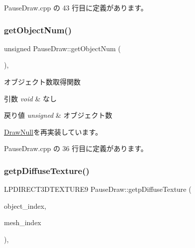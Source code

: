  Pause\+Draw.\+cpp の 43 行目に定義があります。

\mbox{\label{class_pause_draw_a44936b777c942619b85106d7aa4dda14}} 
\subsubsection{\texorpdfstring{get\+Object\+Num()}{getObjectNum()}}
{\footnotesize\ttfamily unsigned Pause\+Draw\+::get\+Object\+Num (\begin{DoxyParamCaption}{ }\end{DoxyParamCaption})\hspace{0.3cm}{\ttfamily [override]}, {\ttfamily [virtual]}}



オブジェクト数取得関数 


\begin{DoxyParams}{引数}
{\em void} & なし \\
\hline
\end{DoxyParams}

\begin{DoxyRetVals}{戻り値}
{\em unsigned} & オブジェクト数 \\
\hline
\end{DoxyRetVals}


\mbox{\hyperlink{class_draw_null_a8bddfa6ee87e47b2ecbbe6803b088e37}{Draw\+Null}}を再実装しています。



 Pause\+Draw.\+cpp の 36 行目に定義があります。

\mbox{\label{class_pause_draw_a191f46de3bb829ab30fca52f902c1df9}} 
\subsubsection{\texorpdfstring{getp\+Diffuse\+Texture()}{getpDiffuseTexture()}}
{\footnotesize\ttfamily L\+P\+D\+I\+R\+E\+C\+T3\+D\+T\+E\+X\+T\+U\+R\+E9 Pause\+Draw\+::getp\+Diffuse\+Texture (\begin{DoxyParamCaption}\item[{unsigned}]{object\+\_\+index,  }\item[{unsigned}]{mesh\+\_\+index }\end{DoxyParamCaption})\hspace{0.3cm}{\ttfamily [override]}, {\ttfamily [virtual]}}



